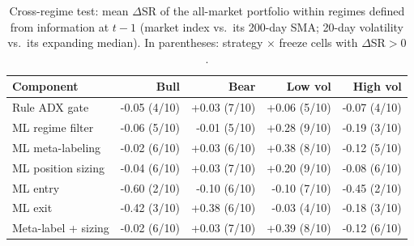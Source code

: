 \begin{longtable}{l r r r r}
\caption{Cross-regime test: mean $\Delta$SR of the all-market portfolio within regimes defined from information at $t-1$ (market index vs.\ its 200-day SMA; 20-day volatility vs.\ its expanding median). In parentheses: strategy $\times$ freeze cells with $\Delta$SR$>0$.} \label{tab:s2reg} \\
\toprule
Component & Bull & Bear & Low vol & High vol \\
\midrule
\endhead
\bottomrule
\endfoot
Rule ADX gate & -0.05 (4/10) & +0.03 (7/10) & +0.06 (5/10) & -0.07 (4/10) \\
ML regime filter & -0.06 (5/10) & -0.01 (5/10) & +0.28 (9/10) & -0.19 (3/10) \\
ML meta-labeling & -0.02 (6/10) & +0.03 (6/10) & +0.38 (8/10) & -0.12 (5/10) \\
ML position sizing & -0.04 (6/10) & +0.03 (7/10) & +0.20 (9/10) & -0.08 (6/10) \\
ML entry & -0.60 (2/10) & -0.10 (6/10) & -0.10 (7/10) & -0.45 (2/10) \\
ML exit & -0.42 (3/10) & +0.38 (6/10) & -0.03 (4/10) & -0.18 (3/10) \\
Meta-label + sizing & -0.02 (6/10) & +0.03 (7/10) & +0.39 (8/10) & -0.12 (6/10) \\
\end{longtable}
